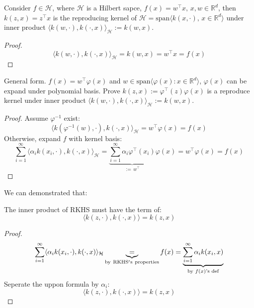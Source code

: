 \documentclass[../main]{subfiles}
\begin{document}
\begin{example}
  Consider $f\in \mathcal H$, where $\mathcal H$ is a Hilbert sapce, $f(x)=w^\top x,\,x,w\in\mathbb R^d$, then $k(z,x)=z^\top x$ is the reproducing kernel of $\mathcal H=\mathrm{span}\langle k(x,\cdot),\, x\in\mathbb R^d\rangle$ under inner product $\langle k(w,\cdot),k(\cdot,x)\rangle_\mathcal H:=k(w,x)$.  
\end{example}
\begin{proof}
    \begin{equation}
        \langle k(w,\cdot),k(\cdot,x)\rangle_\mathcal H=k(w,x)=w^\top x=f(x)
    \end{equation}
\end{proof}

\begin{example}
    General form. $f(x)=w^\top \varphi(x)$ and $w\in\mathrm{span}\langle\varphi(x):x\in\mathbb R^d\rangle$, $\varphi(x)$ can be expand under polynomial basis. Prove $k(z,x):=\varphi^\top(z)\varphi(x)$ is a reproduce kernel under inner product $\langle k(w,\cdot),k(\cdot,x)\rangle_\mathcal H:=k(w,x)$.
\end{example}
\begin{proof}
    Assume $\varphi^{-1}$ exist:
    \begin{equation}
        \langle k(\varphi^{-1}(w),\cdot),k(\cdot,x)\rangle_\mathcal H=w^\top\varphi(x)=f(x)
    \end{equation}
    Otherwise, expand $f$ with kernel basis:
    \begin{equation}
        \sum_{i=1}^\infty\langle \alpha_ik(x_i,\cdot),k(\cdot,x)\rangle_\mathcal H=\underbrace{\sum_{i=1}^\infty\alpha_i\varphi^\top(x_i)}_{:=\,w^\top}\varphi(x)=w^\top \varphi(x)=f(x)
    \end{equation}
\end{proof}
\vspace{1em}
We can demonstrated that:
\begin{proposition}
    The inner product of RKHS must have the term of:
\begin{equation}
    \langle k(z,\cdot),k(\cdot,x)\rangle=k(z,x)
\end{equation}
\end{proposition}
\begin{proof}
    \begin{equation}
        \sum_{i=1}^\infty\langle \alpha_ik(x_i,\cdot),k(\cdot,x)\rangle_\mathcal H\underbrace{=}_{\rm by\ RKHS's\ properties}f(x)=\underbrace{\sum_{i=1}^\infty \alpha_ik(x_i,x)}_{\text{by $f(x)$'s def}}
    \end{equation}
    Seperate the uppon formula by $\alpha_i$:
    \begin{equation}
        \langle k(z,\cdot),k(\cdot,x)\rangle=k(z,x)
    \end{equation}
\end{proof}
\end{document}
